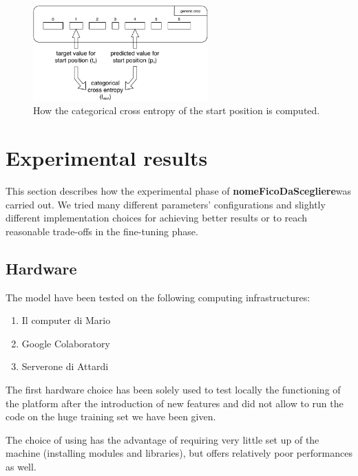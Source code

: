 \documentclass[10pt,hidelinks]{article}
\newcommand{\nomefico}{\textbf{nomeFicoDaScegliere}}
\begin{document}
\begin{figure}[ht!]
	\centering
	\includegraphics[width=0.6\textwidth]{pics/loss.pdf}
	\caption{How the categorical cross entropy of the start position is computed.}\label{fig:loss}
\end{figure}


\section{Experimental results}\label{sec:experimental_results}
This section describes how the experimental phase of \nomefico was carried out. We tried many different parameters' configurations and slightly different implementation choices for achieving better results or to reach reasonable trade-offs in the fine-tuning phase.

\subsection{Hardware}
The model have been tested on the following computing infrastructures:

\begin{enumerate}[label=\upshape-\Roman*-]
	\item\label{item:1} Il computer di Mario 
	\item\label{item:2} Google Colaboratory 
	\item\label{item:3} Serverone di Attardi 
\end{enumerate} 

The first hardware choice has been solely used to test locally the functioning of the platform after the introduction of new features and did not allow to run the code on the huge training set we have been given.

The choice of using  has the advantage of requiring very little set up of the machine (installing modules and libraries), but offers relatively poor performances as well.
\end{document}
